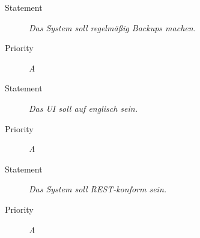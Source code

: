 \UR
\begin{description}
\item[Statement] \textit{Das System soll regelmäßig \glspl{Backup} machen.}%
\item[Priority] \textit{A}
\end{description}

\UR
\begin{description}
\item[Statement] \textit{Das \gls{UI} soll auf englisch sein.}
\item[Priority] \textit{A}
\end{description}

\UR
\begin{description}
\item[Statement] \textit{Das System soll \gls{REST}-konform sein.}
\item[Priority] \textit{A}
\end{description}


